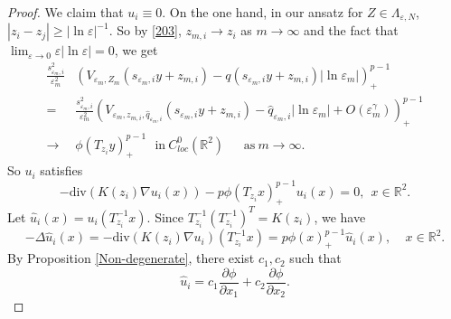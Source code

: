\documentclass[10pt,a4paper]{amsart}
\begin{document}
\begin{proof}
We claim that $ u_i\equiv 0. $ On the one hand, in our ansatz for $ Z\in \Lambda_{\varepsilon, N} $, $ |z_i-z_j|\geq |\ln\varepsilon|^{-1} $. So by \eqref{203}, $ z_{m,i}\to z_i $ as $ m\to\infty $ and the fact that $ \lim_{\varepsilon\to 0}\varepsilon|\ln\varepsilon|=0 $, we get
\begin{equation*}
\begin{split}
\frac{s_{\varepsilon_m,i}^2}{\varepsilon_m^2}&\left (V_{\varepsilon_m, Z_m}(s_{\varepsilon_m, i}y+z_{m,i})-q\left (s_{\varepsilon_m, i}y+z_{m,i}\right )|\ln\varepsilon_m|\right )^{p-1}_+\\
=&\frac{s_{\varepsilon_m,i}^2}{\varepsilon_m^2}\left( V_{\varepsilon_m, z_{m,i}, \hat{q}_{\varepsilon_m,i}}(s_{\varepsilon_m, i}y+z_{m,i})-\hat{q}_{\varepsilon_m,i}|\ln\varepsilon_m|+O\left (\varepsilon_m^{\gamma}\right )\right)^{p-1}_+ \\
\to&\phi(T_{z_i}y)^{p-1}_+\ \  \  \text{in}\ C^0_{loc}(\mathbb{R}^2)\ \ \ \ \ \ \  \text{as}\ m\to\infty.
\end{split}
\end{equation*}
So $ u_i $ satisfies
\begin{equation*}
-\text{div}(K(z_i)\nabla u_i(x))-p\phi(T_{z_i}x)^{p-1}_+u_i(x)=0,\ \ x\in\mathbb{R}^2.
\end{equation*}
Let $ \hat{u}_i(x)=u_i(T_{z_i}^{-1}x) $. Since $ T_{z_i}^{-1}(T_{z_i}^{-1})^T=K(z_i) $, we have
\begin{equation*}
-\Delta \hat{u}_i(x)=-\text{div}(K(z_i)\nabla u_i)(T_{z_i}^{-1}x)=p\phi(x)^{p-1}_+\hat{u}_i(x),\ \ \ \   \ x\in \mathbb{R}^2.
\end{equation*}
By Proposition \ref{Non-degenerate}, there exist $ c_1,c_2 $ such that
\begin{equation}\label{210}
\hat{u}_i=c_1\frac{\partial \phi}{\partial x_1}+c_2\frac{\partial \phi}{\partial x_2}.
\end{equation}


\end{proof}
\end{document}
